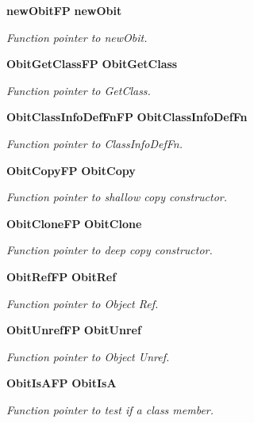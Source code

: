 \begin{CompactItemize}
{\bf new\-Obit\-FP} {\bf new\-Obit}
\begin{CompactList}\small\item\em Function pointer to new\-Obit. \item\end{CompactList}\item 
{\bf Obit\-Get\-Class\-FP} {\bf Obit\-Get\-Class}
\begin{CompactList}\small\item\em Function pointer to Get\-Class. \item\end{CompactList}\item 
{\bf Obit\-Class\-Info\-Def\-Fn\-FP} {\bf Obit\-Class\-Info\-Def\-Fn}
\begin{CompactList}\small\item\em Function pointer to Class\-Info\-Def\-Fn. \item\end{CompactList}\item 
{\bf Obit\-Copy\-FP} {\bf Obit\-Copy}
\begin{CompactList}\small\item\em Function pointer to shallow copy constructor. \item\end{CompactList}\item 
{\bf Obit\-Clone\-FP} {\bf Obit\-Clone}
\begin{CompactList}\small\item\em Function pointer to deep copy constructor. \item\end{CompactList}\item 
{\bf Obit\-Ref\-FP} {\bf Obit\-Ref}
\begin{CompactList}\small\item\em Function pointer to Object Ref. \item\end{CompactList}\item 
{\bf Obit\-Unref\-FP} {\bf Obit\-Unref}
\begin{CompactList}\small\item\em Function pointer to Object Unref. \item\end{CompactList}\item 
{\bf Obit\-Is\-AFP} {\bf Obit\-Is\-A}
\begin{CompactList}\small\item\em Function pointer to test if a class member. \item\end{CompactList}\item 

\end{CompactItemize}
